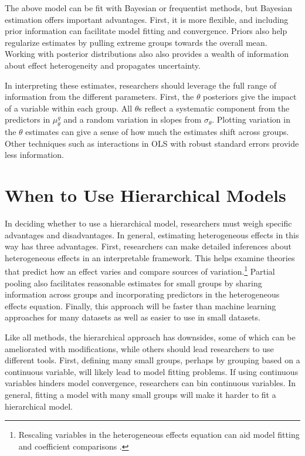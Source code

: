 \documentclass[12pt]{article}
\begin{document}
The above model can be fit with Bayesian or frequentist methods, but Bayesian estimation offers important advantages.
First, it is more flexible, and including prior information can facilitate model fitting and convergence. 
Priors also help regularize estimates by pulling extreme groups towards the overall mean.
Working with posterior distributions also also provides a wealth of information about effect heterogeneity and propagates uncertainty.  


In interpreting these estimates, researchers should leverage the full range of information from the different parameters. 
First, the $\theta$ posteriors give the impact of a variable within each group.
All $\theta$s reflect a systematic component from the predictors in $\mu_\theta^g$ and a random variation in slopes from $\sigma_\theta$. 
Plotting variation in the $\theta$ estimates can give a sense of how much the estimates shift across groups. 
Other techniques such as interactions in OLS with robust standard errors provide less information.


\section{When to Use Hierarchical Models}

In deciding whether to use a hierarchical model, researchers must weigh specific advantages and disadvantages. 
In general, estimating heterogeneous effects in this way has three advantages.
First, researchers can make detailed inferences about heterogeneous effects in an interpretable framework. 
This helps examine theories that predict how an effect varies and compare sources of variation.\footnote{Rescaling variables in the heterogeneous effects equation can aid model fitting and coefficient comparisons \citep{Gelman2008}.} 
Partial pooling also facilitates reasonable estimates for small groups by sharing information across groups and incorporating predictors in the heterogeneous effects equation. 
Finally, this approach will be faster than machine learning approaches for many datasets as well as easier to use in small datasets.


Like all methods, the hierarchical approach has downsides, some of which can be ameliorated with modifications, while others should lead researchers to use different tools. 
First, defining many small groups, perhaps by grouping based on a continuous variable, will likely lead to model fitting problems.
If using continuous variables hinders model convergence, researchers can bin continuous variables.
In general, fitting a model with many small groups will make it harder to fit a hierarchical model. 
\end{document}
